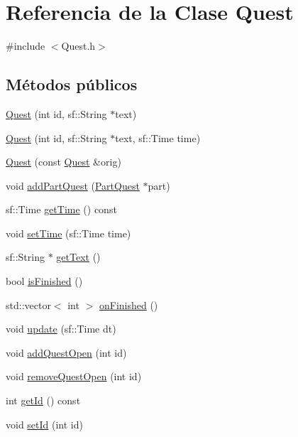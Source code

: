 \hypertarget{classQuest}{}\section{Referencia de la Clase Quest}
\label{classQuest}


{\ttfamily \#include $<$Quest.\+h$>$}

\subsection*{Métodos públicos}
\begin{DoxyCompactItemize}
\item 
\hyperlink{classQuest_a61650b0aba1284905aa8ebd179b6d73d}{Quest} (int id, sf\+::\+String $\ast$text)
\item 
\hyperlink{classQuest_abbc3037881ba6cb3d7984308078bbc23}{Quest} (int id, sf\+::\+String $\ast$text, sf\+::\+Time time)
\item 
\hyperlink{classQuest_ab65f7c10c43586168876a74c5f4c054f}{Quest} (const \hyperlink{classQuest}{Quest} \&orig)
\item 
void \hyperlink{classQuest_af92871b6593c45a837e111826ee5ca25}{add\+Part\+Quest} (\hyperlink{classPartQuest}{Part\+Quest} $\ast$part)
\item 
sf\+::\+Time \hyperlink{classQuest_a1b5f2c8524f30a88214da003f41ad329}{get\+Time} () const 
\item 
void \hyperlink{classQuest_a68f13a90502307e82ac24112fda3ecde}{set\+Time} (sf\+::\+Time time)
\item 
sf\+::\+String $\ast$ \hyperlink{classQuest_af714e617eb99803a2e6459cb853cda00}{get\+Text} ()
\item 
bool \hyperlink{classQuest_ac6db87bb6ec663c16d38b67baceb10ff}{is\+Finished} ()
\item 
std\+::vector$<$ int $>$ \hyperlink{classQuest_af9233e7f9b5aa42038ba2244844d9700}{on\+Finished} ()
\item 
void \hyperlink{classQuest_a522c7653b498a7921afd6d4bb03120d9}{update} (sf\+::\+Time dt)
\item 
void \hyperlink{classQuest_a10eb74f76c110f71bf82dc5e8be4a446}{add\+Quest\+Open} (int id)
\item 
void \hyperlink{classQuest_ae4ec082cef55170dd6d8841cf2a4801d}{remove\+Quest\+Open} (int id)
\item 
int \hyperlink{classQuest_a4bc0819c3b54a86ed2c55be48486ed8b}{get\+Id} () const 
\item 
void \hyperlink{classQuest_af2667a3a83e8adc9ae1c5bd05ce4236e}{set\+Id} (int id)

\end{DoxyCompactItemize}
